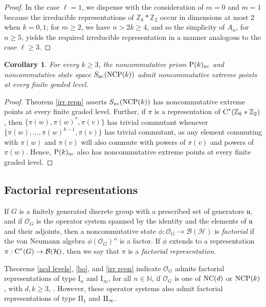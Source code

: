 \documentclass{amsart}
\newtheorem{corollary}[theorem]{Corollary}
\theoremstyle{definition}
\theoremstyle{remark}
\newcommand{\B}{\mathcal{B}}
\renewcommand{\H}{\mathcal{H}}
\newcommand\cstar{{\textrm C}^*}                              %
\numberwithin{equation}{section}
\begin{document}
\begin{proof}
In the case $\ell=1$, we dispense with the consideration of  $m=0$ and $m=1$ because the irreducible 
representations of $\mathbb Z_k*\mathbb Z_2$
occur in dimensions at most $2$ when $k=0,1$; for $m\geq 2$, we have $n>2k\geq 4$, and so the simplicity of $A_n$, for $n\geq 5$, yields the required
irreducible representation in a manner analogous to the case $\ell\geq3$.
\end{proof}

\begin{corollary} For every $k\geq 3$, the noncommutative prism
$\mbox{\textrm P}(k)_{\textrm{nc}}$ and noncommutative state space $S_{\textrm{nc}}(\mbox{\textrm{NCP}}(k))$
admit noncommutative extreme points at every finite graded level.
\end{corollary}

\begin{proof} Theorem \ref{irr repn} asserts $S_{\textrm{nc}}(\mbox{\textrm{NCP}}(k))$
has noncommutative extreme points at every finite graded level. Further, if $\pi$ is a representation of $\cstar(\mathbb Z_k * \mathbb Z_2)$, then
$\{\pi(w),\pi(w)^*,\pi(v)\}$ has trivial commutant whenever $\{\pi(w),\dots,\pi(w)^{k-1},\pi(v)\}$ has trivial commutant,
as any element commuting with 
$\pi(w)$ and $\pi(v)$ will also commute with powers of $\pi(v)$ and powers of $\pi(w)$. Hence, 
$\mbox{\textrm P}(k)_{\textrm{nc}}$ also has noncommutative extreme points at every finite graded level.
\end{proof}


\subsection{Factorial representations}

If $G$ is a finitely generated discrete group with a prescribed set of generators $\mathfrak u$, and if $\mathcal O_G$
is the operator system spanned by the identity and the elements of $\mathfrak u$ and their adjoints, then a noncommutative
state $\phi:\mathcal O_G\rightarrow\B(\H)$ is \emph{factorial} if the von Neumann algebra $\phi(\mathcal O_G)''$ is a factor.
If $\phi$ extends to a representation $\pi:\cstar(G)\rightarrow\B(\H)$, then we say that $\pi$ is a \emph{factorial representation}.

Theorems \ref{ncd levels}, \ref{bo}, and \ref{irr repn} indicate $\mathcal O_G$ admits factorial representations
of type I${}_n$ and I${}_\infty$, for all $n\in\mathbb N$, if $\mathcal O_G$ is one of $\mbox{\textrm{NC}}(d)$ or $\mbox{\textrm{NCP}}(k)$, with $d,k\geq3$, .
However, these operator systems also admit factorial representations of type II${}_1$ and $\mbox{\textrm II}_\infty$.
\end{document}
